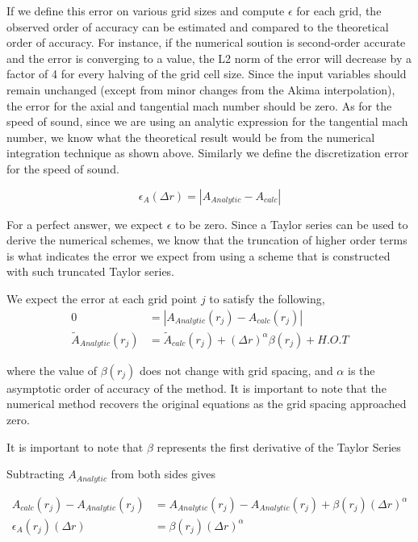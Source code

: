 \documentclass[12pt]{article}
\begin{document}
If we define this error on various grid sizes and compute $\epsilon$ for
each grid, the observed order of accuracy can be estimated and compared to
the theoretical order of accuracy. For instance, if the numerical soution
is second-order accurate and the error is converging to a value, the L2 norm of
the error will decrease by a factor of 4 for every halving of the grid cell 
size. 
Since the input variables should remain unchanged (except from minor changes 
from the Akima interpolation), the error for the axial and tangential mach 
number should be zero. As for the speed of sound, since we are using an analytic
expression for the tangential mach number, we know what the theoretical result
would be from the numerical integration technique as shown above. 
Similarly we define the discretization error for the speed of sound.

\[ \epsilon_{A}(\Delta r) = |A_{Analytic}-A_{calc}|\]

For a perfect answer, we expect $\epsilon$ to be zero. Since a Taylor series can 
be used to derive the numerical schemes, we know that the truncation of higher
order terms is what indicates the error we expect from using a scheme that 
is constructed with such truncated Taylor series.

We expect the error at each grid point $j$ to satisfy the following,
\begin{align*}
    0 &= |A_{Analytic}(r_j) - A_{calc}(r_j)| \\
    \widetilde{A}_{Analytic}(r_j) &= \widetilde{A}_{calc}(r_j) +
    (\Delta r)^{\alpha} \beta(r_j)  + H.O.T
\end{align*}

where the value of $\beta(r_j)$ does not change with grid spacing, and 
$\alpha$ is the asymptotic order of accuracy of the method. It is important to
note that the numerical method recovers the original equations as the grid 
spacing approached zero. 

It is important to note that $\beta$ represents the first derivative of the 
Taylor Series

Subtracting $A_{Analytic}$ from both sides gives

\begin{align*}
    A_{calc}(r_j) - A_{Analytic}(r_j) &= A_{Analytic}(r_j) - A_{Analytic}(r_j)
    + \beta(r_j) (\Delta r)^{\alpha} \\
    \epsilon_A(r_j)(\Delta r) &= \beta(r_j) (\Delta r)^{\alpha}
\end{align*}
\end{document}
